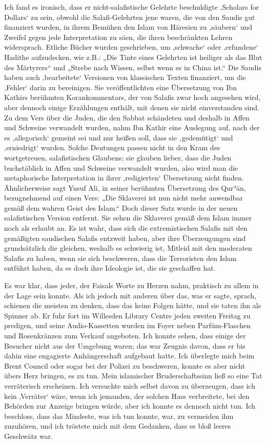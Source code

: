 \documentclass[12pt]{memoir}
\def\´{ʾ} %
\def \Quran{Qur\-\´ān} %
\def\–{\hskip0pt-\hskip0pt}
\begin{document}
Ich fand es ironisch,
dass er nicht\–salafistische Gelehrte beschuldigte
‚Scholars for Dollars‘ zu sein,
obwohl die Salafi\–Gelehrten jene waren,
die von den Saudis gut finanziert wurden,
in ihrem Bemühen den Islam von Häresien zu ‚säubern‘
und Zweifel gegen jede Interpretation zu säen,
die ihren beschränkten Lehren widersprach.
Etliche Bücher wurden geschrieben,
um ‚schwache‘ oder ‚erfundene‘ Hadithe aufzudecken, wie z.B.:
„Die Tinte eines Gelehrten ist heiliger als das Blut des Märtyrers“
und „Strebe nach Wissen, selbst wenn es in China ist.“
Die Saudis haben auch ‚bearbeitete‘ Versionen
von klassischen Texten finanziert, um die ‚Fehler‘ darin zu bereinigen.
Sie veröffentlichten eine Übersetzung
von Ibn Kathirs berühmten Korankommentars,
der von Salafis zwar hoch angesehen wird,
aber dennoch einige Erzählungen enthält,
mit denen sie nicht einverstanden sind.
Zu dem Vers über die Juden, die den Sabbat schändeten
und deshalb in Affen und Schweine verwandelt wurden,
nahm Ibn Kathir eine Auslegung auf,
nach der es ‚allegorisch‘ gemeint sei und nur heißen soll,
dass sie ‚gedemütigt‘ und ‚erniedrigt‘ wurden.
Solche Deutungen passen nicht in den Kram
des wortgetreuen, salafistischen Glaubens;
sie glauben lieber, dass die Juden buchstäblich
in Affen und Schweine verwandelt wurden,
also wird man die metaphorische Interpretation
in ihrer ‚redigierten‘ Übersetzung nicht finden.
Ähnlicherweise sagt Yusuf Ali,
in seiner berühmten Übersetzung des \Quran,
bezugnehmend auf einen Vers:
„Die Sklaverei ist nun nicht mehr anwendbar gemäß dem wahren Geist des Islam.“
Doch dieser Satz wurde in der neuen salafistischen Version entfernt.
Sie sehen die Sklaverei gemäß dem Islam immer noch als erlaubt an.
Es ist wahr, dass sich die extremistischen Salafis
mit den gemäßigten saudischen Salafis entzweit haben,
aber ihre Überzeugungen sind grundsätzlich die gleichen,
weshalb es schwierig ist, Mitleid mit den moderaten Salafis zu haben,
wenn sie sich beschweren, dass die Terroristen den Islam entführt haben,
da es doch ihre Ideologie ist, die sie geschaffen hat.

Es war klar, dass jeder, der Faisals Worte zu Herzen nahm,
praktisch zu allem in der Lage sein konnte.
Als ich jedoch mit anderen über das, was er sagte, sprach,
schienen die meisten zu denken, dass das keine Folgen hätte,
und sie taten ihn als Spinner ab.
Er fuhr fort im Willesden Library Centre jeden zweiten Freitag zu predigen,
und seine Audio\–Kassetten wurden im Foyer
neben Parfüm\–Flaschen und Rosenkränzen zum Verkauf angeboten.
Ich konnte sehen, dass einige der Besucher nicht aus der Umgebung waren;
das war Zeugnis davon, dass er bis dahin
eine engagierte Anhängerschaft aufgebaut hatte.
Ich überlegte mich beim Brent Council oder sogar bei der Polizei zu beschweren,
konnte es aber nicht übers Herz bringen, es zu tun.
Mein islamischer Bruderschaftssinn
ließ so eine Tat verräterisch erscheinen.
Ich versuchte mich selbst davon zu überzeugen,
dass ich kein ‚Verräter‘ wäre,
wenn ich jemanden, der solchen Hass verbreitete,
bei den Behörden zur Anzeige bringen würde,
aber ich konnte es dennoch nicht tun.
Ich beschloss, dass das Mindeste, was ich tun konnte, war,
zu vermeiden ihm zuzuhören,
und ich tröstete mich mit dem Gedanken,
dass es bloß leeres Geschwätz war.
\end{document}
